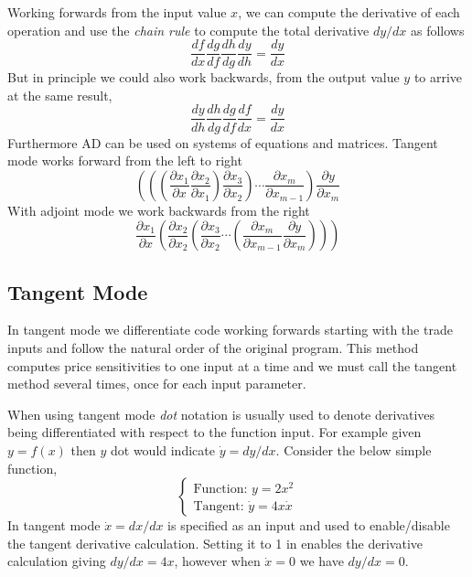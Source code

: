 \documentclass[12pt,a4paper]{article}
\begin{document}
Working forwards from the input value $x$, we can compute the derivative of each operation and use the \emph{chain rule} to compute the total derivative $dy/dx$ as follows
\begin{equation}
\frac{df}{dx}\frac{dg}{df}\frac{dh}{dg}\frac{dy}{dh}=\frac{dy}{dx}
\end{equation}
But in principle we could also work backwards, from the output value $y$ to arrive at the same result,
\begin{equation}
\frac{dy}{dh}\frac{dh}{dg}\frac{dg}{df}\frac{df}{dx}=\frac{dy}{dx}
\end{equation}
Furthermore AD can be used on systems of equations and matrices. 
Tangent mode works forward from the left to right
\begin{equation}
\left(\left(\left(\frac{\partial x_1}{\partial x}\frac{\partial x_2}{\partial x_1}\right)\frac{\partial x_3}{\partial x_2}\right)\cdots\frac{\partial x_m}{\partial x_{m-1}}\right)\frac{\partial y}{\partial x_m}
\end{equation}
With adjoint mode we work backwards from the right
\begin{equation}
\frac{\partial x_1}{\partial x}\left(\frac{\partial x_2}{\partial x_2}\left(\frac{\partial x_3}{\partial x_2}\cdots\left(\frac{\partial x_m}{\partial x_{m-1}}\frac{\partial y}{\partial x_m}\right)\right)\right)
\end{equation}

\subsection{Tangent Mode}
In tangent mode we differentiate code working forwards starting with the trade inputs and follow the natural order of the original program. This method computes price sensitivities to one input at a time and we must call the tangent method several times, once for each input parameter.

When using tangent mode \emph{dot} notation is usually used to denote derivatives being differentiated with respect to the function input. For example given $y = f(x)$ then $y$ dot would indicate $\dot{y} = dy/dx$.
Consider the below simple function,
\begin{equation}
\begin{cases}
\text{Function: } y = 2x^2\\
\text{Tangent: } \dot{y} = 4x\dot{x}
\end{cases}
\label{eq:aad_function}
\end{equation}
In tangent mode $\dot{x}=dx/dx$ is specified as an input and used to enable/disable the tangent derivative calculation. Setting it to 1 in enables the derivative calculation giving
$dy/dx = 4x$, however when $\dot{x}= 0$ we have $dy/dx = 0$.
\end{document}
